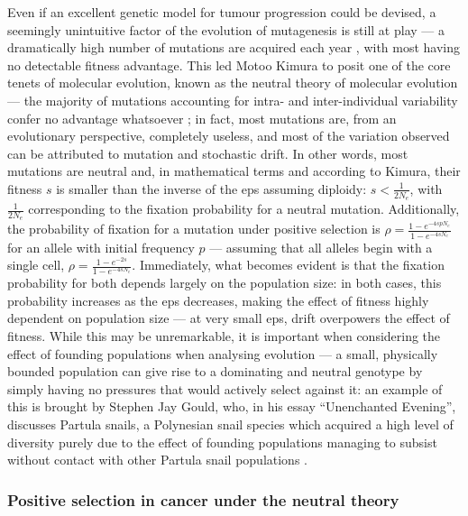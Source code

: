 Even if an excellent genetic model for tumour progression could be devised, a seemingly unintuitive factor of the evolution of mutagenesis is still at play --- a dramatically high number of mutations are acquired each year \cite{Kimura1968-xd}, with most having no detectable fitness advantage. This led Motoo Kimura to posit one of the core tenets of molecular evolution, known as the neutral theory of molecular evolution --- the majority of mutations accounting for intra- and inter-individual variability confer no advantage whatsoever \cite{Kimura1979-ps}; in fact, most mutations are, from an evolutionary perspective, completely useless, and most of the variation observed can be attributed to mutation and stochastic drift. In other words, most mutations are neutral and, in mathematical terms and according to Kimura, their fitness $s$ is smaller than the inverse of the \ac{eps} assuming diploidy: $s<\frac{1}{2N_e}$, with $\frac{1}{2N_e}$ corresponding to the fixation probability for a neutral mutation. Additionally, the probability of fixation for a mutation under positive selection is $\rho = \frac{1-e^{-4spN_e}}{1-e^{-4sN_e}}$ for an allele with initial frequency $p$ \cite{Kimura1962-df} --- assuming that all alleles begin with a single cell, $\rho = \frac{1-e^{-2s}}{1-e^{-4sN_e}}$. Immediately, what becomes evident is that the fixation probability for both depends largely on the population size: in both cases, this probability increases as the \ac{eps} decreases, making the effect of fitness highly dependent on population size --- at very small \ac{eps}, drift overpowers the effect of fitness. While this may be unremarkable, it is important when considering the effect of founding populations when analysing evolution --- a small, physically bounded population can give rise to a dominating and neutral genotype by simply having no pressures that would actively select against it: an example of this is brought by Stephen Jay Gould, who, in his essay “Unenchanted Evening”, discusses Partula snails, a Polynesian snail species which acquired a high level of diversity purely due to the effect of founding populations managing to subsist without contact with other Partula snail populations \cite{Gould1995-yr}.

\subsubsection{Positive selection in cancer under the neutral theory}


